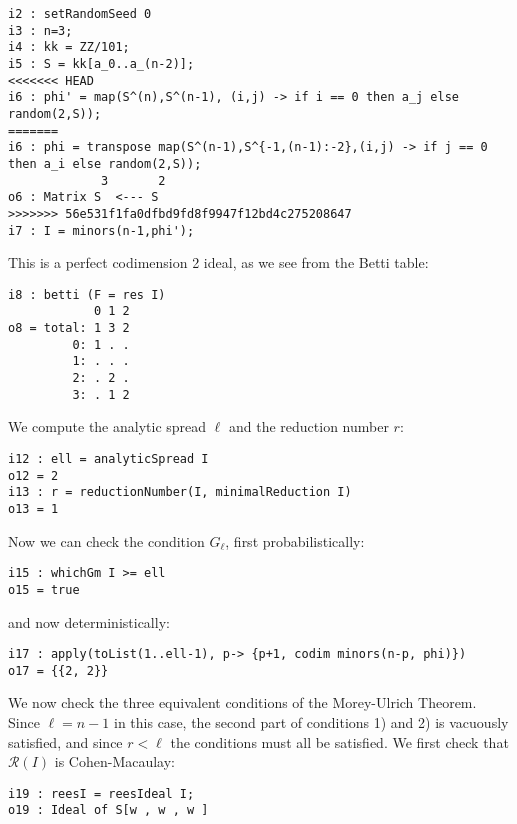 \documentclass[twoside,12pt, leqno]{amsart}
\def\RR{{\mathcal R}}
\begin{document}
\begin{normalsize}
\begin{footnotesize}
 \begin{verbatim}
i2 : setRandomSeed 0
i3 : n=3;
i4 : kk = ZZ/101;
i5 : S = kk[a_0..a_(n-2)];
<<<<<<< HEAD
i6 : phi' = map(S^(n),S^(n-1), (i,j) -> if i == 0 then a_j else random(2,S));
=======
i6 : phi = transpose map(S^(n-1),S^{-1,(n-1):-2},(i,j) -> if j == 0 then a_i else random(2,S));
             3       2
o6 : Matrix S  <--- S
>>>>>>> 56e531f1fa0dfbd9fd8f9947f12bd4c275208647
i7 : I = minors(n-1,phi');
\end{verbatim}
\end{footnotesize}
This is a perfect codimension 2 ideal, as we see from the Betti table:
\begin{footnotesize}
 \begin{verbatim}
i8 : betti (F = res I)
            0 1 2
o8 = total: 1 3 2
         0: 1 . .
         1: . . .
         2: . 2 .
         3: . 1 2
\end{verbatim}
 \end{footnotesize}
We  compute the analytic spread $\ell$ and the reduction number $r$:
\begin{footnotesize}
 \begin{verbatim}
i12 : ell = analyticSpread I
o12 = 2
i13 : r = reductionNumber(I, minimalReduction I)
o13 = 1
\end{verbatim}
\end{footnotesize}
Now we can check the condition $G_{\ell}$, first probabilistically:
\begin{footnotesize}
 \begin{verbatim}
i15 : whichGm I >= ell
o15 = true
\end{verbatim}
\end{footnotesize}
and now deterministically:
\begin{footnotesize}
 \begin{verbatim}
i17 : apply(toList(1..ell-1), p-> {p+1, codim minors(n-p, phi)})
o17 = {{2, 2}}
\end{verbatim}
\end{footnotesize}
We now check the three equivalent conditions of the Morey-Ulrich Theorem.
           Since $\ell = n-1$ in this case, the second part of conditions
           1) and 2) is vacuously satisfied, and since $r<\ell$
           the conditions must all be satisfied.
           We first check that $\RR(I)$ is Cohen-Macaulay:
\begin{footnotesize}
 \begin{verbatim}
i19 : reesI = reesIdeal I;
o19 : Ideal of S[w , w , w ]

\end{verbatim}
\end{footnotesize}
\end{normalsize}
\end{document}
